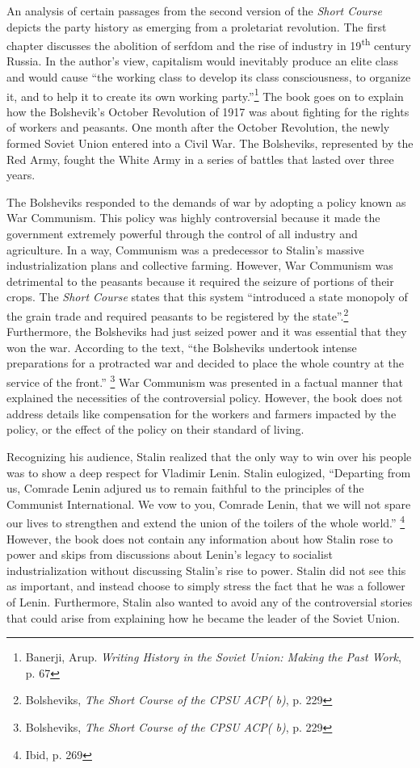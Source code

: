 \documentclass[a4paper, twocolumn]{article}
\begin{document}
An analysis of certain passages from the second version of the \emph{Short
Course} depicts the party history as emerging from a proletariat
revolution. The first chapter discusses the abolition of serfdom and
the rise of industry in 19\textsuperscript{th} century Russia. In the author’s view,
capitalism would inevitably produce an elite class and would cause
``the working class to develop its class consciousness, to organize it,
and to help it to create its own working party.''\footnote{Banerji, Arup. \emph{Writing History in the Soviet Union: Making the Past Work}, p. 67} The book goes on to
explain how the Bolshevik's October Revolution of 1917 was about
fighting for the rights of workers and peasants. One month after the
October Revolution, the newly formed Soviet Union entered into a Civil
War.  The Bolsheviks, represented by the Red Army, fought the White
Army in a series of battles that lasted over three years.

The Bolsheviks responded to the demands of war by adopting a policy
known as War Communism. This policy was highly controversial because
it made the government extremely powerful through the control of all
industry and agriculture. In a way, Communism was a predecessor to
Stalin’s massive industrialization plans and collective farming.
However, War Communism was detrimental to the peasants because it
required the seizure of portions of their crops. The \emph{Short Course}
states that this system “introduced a state monopoly of the grain
trade and required peasants to be registered by the state”.\footnote{Bolsheviks, \emph{The Short Course of the CPSU ACP( b)}, p. 229}
Furthermore, the Bolsheviks had just seized power and it was essential
that they won the war. According to the text, ``the Bolsheviks
undertook intense preparations for a protracted war and
decided to place the whole country at the service of the
front.'' \footnote{ Bolsheviks, \emph{The Short Course of the CPSU ACP( b)}, p. 229} War Communism was presented in a factual manner that
explained the necessities of the controversial policy. However, the
book does not address details like compensation for the workers and
farmers impacted by the policy, or the effect of the policy on their
standard of living.

Recognizing his audience, Stalin realized that the only way to win
over his people was to show a deep respect for Vladimir Lenin. Stalin
eulogized, ``Departing from us, Comrade Lenin adjured us to remain
faithful to the principles of the Communist International. We vow to
you, Comrade Lenin, that we will not spare our lives to strengthen and
extend the union of the toilers of the whole world.'' \footnote{Ibid, p. 269} However, the
book does not contain any information about how Stalin rose to power
and skips from discussions about Lenin’s legacy to socialist
industrialization without discussing Stalin’s rise to power. Stalin
did not see this as important, and instead choose to simply stress the fact
that he was a follower of Lenin. Furthermore, Stalin also wanted to
avoid any of the controversial stories that could arise from
explaining how he became the leader of the Soviet Union.
\end{document}
